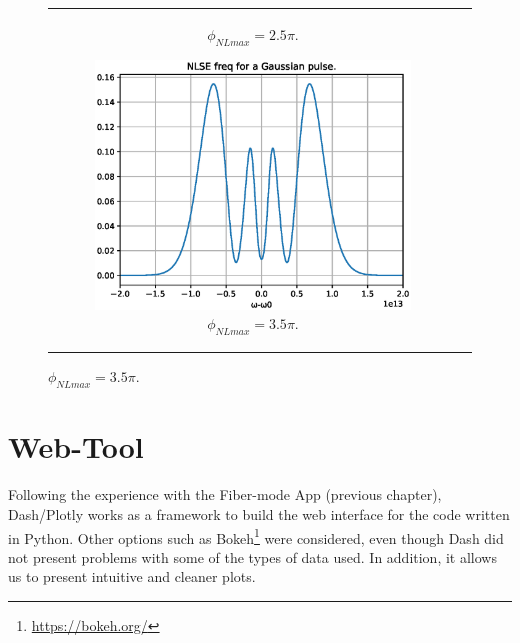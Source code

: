 \begin{figure}[label={fig:spmssfm}, caption={Shape of the spectra for Gaussian pulses by maximum phase shift ($\phi_{NL}$).}]
\begin{tabular}[c]{cc}
\begin{subfigure}[b]{.53\textwidth}
            \caption{$\phi_{NLmax}= 2.5\pi$.}
            \label{fig:spm25pi}
        \end{subfigure}
        \hfill
        \begin{subfigure}[b]{.53\textwidth}
		    \centering	
            \includegraphics[width=1\linewidth]{figures/chap3/ssfm_spm/3_5pi.eps}
            \caption{$\phi_{NLmax}= 3.5\pi$.}
            \label{fig:spm35pi}
        \end{subfigure}
        \end{tabular}
        \end{figure}
    
    
    
\section{Web-Tool}
    Following the experience with the Fiber-mode App (previous chapter), Dash/Plotly works as a framework to build the web interface for the code written in Python. Other options such as Bokeh\footnote{\url{https://bokeh.org/}}  were considered, even though Dash did not present problems with some of the types of data used. In addition, it allows us to present intuitive and cleaner plots. 
    

